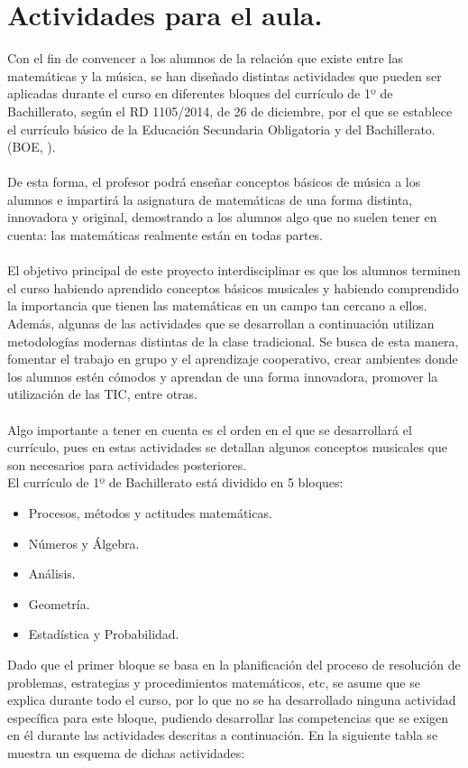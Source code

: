 \documentclass[a4paper, openright, 11pt, titlepage]{report}
\theoremstyle{definition}\newtheorem{defin}[propo]{Definition}
\theoremstyle{definition}\newtheorem{obser}[propo]{Remark}
\theoremstyle{definition}\newtheorem{ejem}[propo]{Ejemplo}
\theoremstyle{definition}\newtheorem{algoritmo}[propo]{Algoritmo}
\begin{document}
\chapter{Actividades para el aula.}
Con el fin de convencer a los alumnos de la relación que existe entre las matemáticas y la música, se han diseñado distintas actividades que pueden ser aplicadas durante el curso en diferentes bloques del currículo de 1º de Bachillerato, según el RD 1105/2014, de 26 de diciembre, por el que se establece el currículo básico de la Educación Secundaria Obligatoria y del Bachillerato. (BOE, \cite{boe}).\\\\
De esta forma, el profesor podrá enseñar conceptos básicos de música a los alumnos e impartirá la asignatura de matemáticas de una forma distinta, innovadora y original, demostrando a los alumnos algo que no suelen tener en cuenta: las matemáticas realmente están en todas partes.\\\\
El objetivo principal de este proyecto interdisciplinar es que los alumnos terminen el curso habiendo aprendido conceptos básicos musicales y habiendo comprendido la importancia que tienen las matemáticas en un campo tan cercano a ellos. Además, algunas de las actividades que se desarrollan a continuación utilizan metodologías modernas distintas de la clase tradicional. Se busca de esta manera, fomentar el trabajo en grupo y el aprendizaje cooperativo, crear ambientes donde los alumnos estén cómodos y aprendan de una forma innovadora, promover la utilización de las TIC, entre otras.\\\\
Algo importante a tener en cuenta es el orden en el que se desarrollará el currículo, pues en estas actividades se detallan algunos conceptos musicales que son necesarios para actividades posteriores.\\
El currículo de 1º de Bachillerato está dividido en 5 bloques:
\begin{itemize}
    \item Procesos, métodos y actitudes matemáticas.
    \item Números y Álgebra.
    \item Análisis.
    \item Geometría.
    \item Estadística y Probabilidad.
\end{itemize}
Dado que el primer bloque se basa en la planificación del proceso de resolución de problemas, estrategias y procedimientos matemáticos, etc, se asume que se explica durante todo el curso, por lo que no se ha desarrollado ninguna actividad específica para este bloque, pudiendo desarrollar las competencias que se exigen en él durante las actividades descritas a continuación. En la siguiente tabla se muestra un esquema de dichas actividades:
\end{document}
